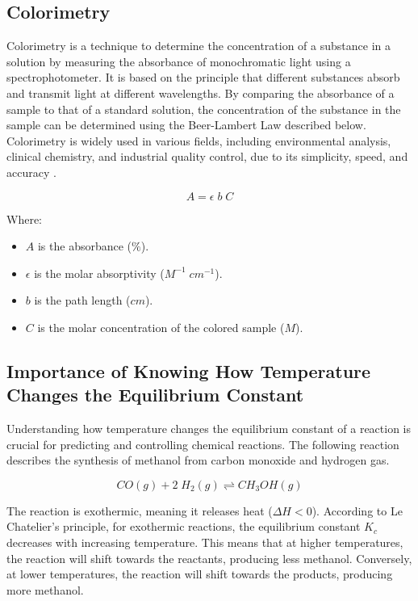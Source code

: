 \subsection{Colorimetry}
Colorimetry is a technique to determine the concentration of a substance in a solution by measuring the absorbance of monochromatic light using a spectrophotometer. It is based on the principle that different substances absorb and transmit light at different wavelengths. By comparing the absorbance of a sample to that of a standard solution, the concentration of the substance in the sample can be determined using the Beer-Lambert Law described below. Colorimetry is widely used in various fields, including environmental analysis, clinical chemistry, and industrial quality control, due to its simplicity, speed, and accuracy \citep{clydesdale1978colorimetry}.

\begin{equation}
    A=\epsilon \; b \; C \label{eq:beer_lambert_law}
\end{equation}

\noindent
Where:
\begin{itemize}[noitemsep,nolistsep]
    \item \(A\) is the absorbance (\(\%\)).
    \item \(\epsilon\) is the molar absorptivity (\(M^{-1} \; cm^{-1}\)).
    \item \(b\) is the path length (\(cm\)).
    \item \(C\) is the molar concentration of the colored sample (\(M\)).
\end{itemize}

\subsection{Importance of Knowing How Temperature Changes the Equilibrium Constant}
Understanding how temperature changes the equilibrium constant of a reaction is crucial for predicting and controlling chemical reactions. The following reaction describes the synthesis of methanol from carbon monoxide and hydrogen gas.

\begin{equation*}
    CO (g) + 2 \; H_2 (g) \rightleftharpoons CH_3OH (g)
\end{equation*}

The reaction is exothermic, meaning it releases heat (\(\Delta H < 0\)). According to Le Chatelier’s principle, for exothermic reactions, the equilibrium constant \(K_c\) decreases with increasing temperature. This means that at higher temperatures, the reaction will shift towards the reactants, producing less methanol. Conversely, at lower temperatures, the reaction will shift towards the products, producing more methanol.


